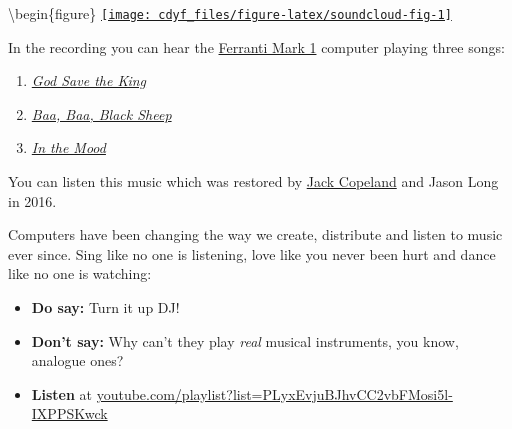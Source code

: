 \documentclass[
]{book}
\providecommand{\tightlist}{%
  \setlength{\itemsep}{0pt}\setlength{\parskip}{0pt}}
\begin{document}
\textbackslash begin\{figure\}
\href{https://w.soundcloud.com/player/?url=https%3A//api.soundcloud.com/tracks/286040117&amp;color=ff5500&amp;auto_play=false&amp;hide_related=false&amp;show_comments=true&amp;show_user=true&amp;show_reposts=false}{\texttt{[image: cdyf\_files/figure-latex/soundcloud-fig-1]} }%



In the recording you can hear the \href{https://en.wikipedia.org/wiki/Ferranti_Mark_1}{Ferranti Mark 1} computer playing three songs:

\begin{enumerate}
\def\labelenumi{\arabic{enumi}.}
\tightlist
\item
  \emph{\href{https://en.wikipedia.org/wiki/God_Save_the_King}{God Save the King}} \citep{godsavethequeen}
\item
  \emph{\href{https://en.wikipedia.org/wiki/Baa,_Baa,_Black_Sheep}{Baa, Baa, Black Sheep}} \citep{baabaablacksheep}
\item
  \emph{\href{https://en.wikipedia.org/wiki/In_the_Mood}{In the Mood}} \citep{inthemood}
\end{enumerate}

You can listen this music which was restored by \href{https://en.wikipedia.org/wiki/Jack_Copeland}{Jack Copeland} and Jason Long in 2016. \citep{restoringmusic}

Computers have been changing the way we create, distribute and listen to music ever since. Sing like no one is listening, love like you never been hurt and dance like no one is watching:

\begin{itemize}
\tightlist
\item
  \textbf{Do say:} Turn it up DJ!
\item
  \textbf{Don't say:} Why can't they play \emph{real} musical instruments, you know, analogue ones?
\item
  \textbf{Listen} at \href{https://youtube.com/playlist?list=PLyxEvjuBJhvCC2vbFMosi5l-IXPPSKwck}{youtube.com/playlist?list=PLyxEvjuBJhvCC2vbFMosi5l-IXPPSKwck}
\end{itemize}
\end{document}
